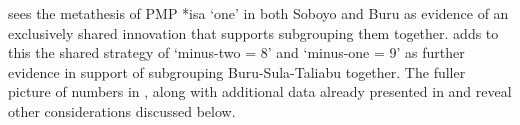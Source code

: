 \citet[26]{Blust1981} sees the metathesis of PMP *isa ‘one’ in
both Soboyo and Buru as evidence of an exclusively shared innovation that
supports subgrouping them together.
\citet[35f]{Collins1981} adds to this the shared strategy of ‘minus-two
= 8’ and ‘minus-one = 9’ as further evidence in support of
subgrouping Buru-Sula-Taliabu together.
The fuller picture of numbers in ,
along with additional data already presented in 
and  reveal other considerations discussed below.


